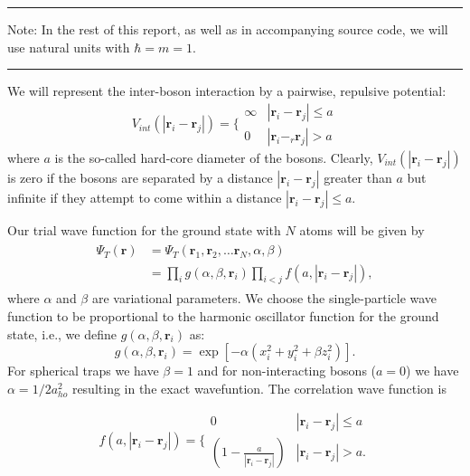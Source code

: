 \documentclass[twocolumn]{article}
\begin{document}
\vspace{0.3cm}\hrule\vspace{0.2cm}
Note: In the rest of this report, as well as in accompanying source code, we
will use natural units with $\hbar = m = 1$.
\vspace{0.2cm}\hrule\vspace{0.3cm}

We will represent the inter-boson interaction by a pairwise,
repulsive potential:
\begin{equation}
    V_{int}(|\mathbf{r}_i-\mathbf{r}_j|) =  \Bigg\{
        \begin{array}{ll}
            \infty & {|\mathbf{r}_i-\mathbf{r}_j|} \leq {a}\\
            0 & {|\mathbf{r}_i-_r\mathbf{r}_j|} > {a}
        \end{array}
\end{equation}
where $a$ is the so-called hard-core diameter of the bosons.
Clearly, $V_{int}(|\mathbf{r}_i-\mathbf{r}_j|)$ is zero if the bosons are
separated by a distance $|\mathbf{r}_i-\mathbf{r}_j|$ greater than $a$ but
infinite if they attempt to come within a distance $|\mathbf{r}_i-\mathbf{r}_j| \leq a$.

Our trial wave function for the ground state with $N$ atoms will be given by
\begin{align}
    \begin{split}
    \Psi_T(\mathbf{r})&=\Psi_T(\mathbf{r}_1, \mathbf{r}_2, \dots
    \mathbf{r}_N,\alpha,\beta)\\
    &=\prod_i g(\alpha,\beta,\mathbf{r}_i)\prod_{i<j}f(a,|\mathbf{r}_i-\mathbf{r}_j|),
    \end{split}
    \label{eq:trialwf}
\end{align}
where $\alpha$ and $\beta$ are variational parameters. We choose the
single-particle wave function to be proportional to the harmonic
oscillator function for the ground state, i.e., we define $g(\alpha,\beta,\mathbf{r}_i)$ as:
\begin{equation}
    g(\alpha,\beta,\mathbf{r}_i)= \exp[-\alpha(x_i^2+y_i^2+\beta z_i^2)].
\end{equation}
For spherical traps we have $\beta = 1$ and for non-interacting
bosons ($a=0$) we have $\alpha = 1/2a_{ho}^2$ resulting in the exact wavefuntion.  The correlation wave
function is

\begin{equation}
    f(a,|\mathbf{r}_i-\mathbf{r}_j|)=\Bigg\{
        \begin{array}{ll}
            0 & {|\mathbf{r}_i-\mathbf{r}_j|} \leq {a}\\
            (1-\frac{a}{|\mathbf{r}_i-\mathbf{r}_j|}) & {|\mathbf{r}_i-\mathbf{r}_j|} > {a}.
        \end{array}
\end{equation}
\end{document}
